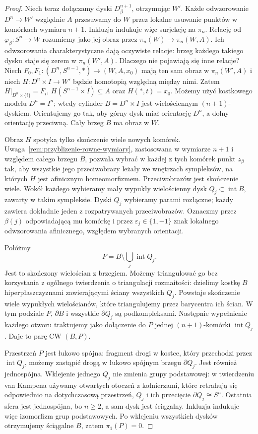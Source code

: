 \begin{proof}
Niech teraz dołączamy dyski $D^{n+1}_\beta$, otrzymując $W'$.
Każde odwzorowanie $D^n\to W'$ względnie $A$ przesuwamy do $W$
przez lokalne usuwanie punktów w komórkach wymiaru $n+1$.
Inkluzja indukuje więc surjekcję na $\pi_n$.
Relację od $\varphi_\beta:S^n\to W$ rozumiemy jako jej obraz
przez $\pi_n(W)\to\pi_n(W,A)$.
Ich odwzorowania charakterystyczne
dają oczywiste relacje:
brzeg każdego takiego
dysku staje się zerem
w $\pi_n(W',A)$.
Dlaczego nie pojawiają się inne relacje?
Niech $F_0,F_1:(D^n,S^{n-1},*)\to(W,A,x_0)$ mają
ten sam obraz w $\pi_n(W',A)$ i niech
$H:D^n\times I\to W'$ będzie homotopią względną między nimi.
Zatem $H|_{D^n\times\{i\}}=F_i$,
$H(S^{n-1}\times I)\subseteq A$ oraz $H(*,t)=x_0$.
Możemy użyć kostkowego modelu $D^n=I^n$;
wtedy cylinder $B=D^n\times I$ jest wielościennym
$(n+1)$-dyskiem. Orientujemy go tak, aby górny dysk
miał orientację $D^n$, a dolny orientację przeciwną.
Cały brzeg $B$ ma obraz w $W$.

Obraz $H$ spotyka tylko skończenie wiele nowych komórek.
Uwaga~\ref{rem:przyblizenie-rowne-wymiary}, zastosowana
w wymiarze $n+1$ i względem całego brzegu $B$, pozwala
wybrać w każdej z tych komórek punkt $z_\beta$ tak, aby
wszystkie jego przeciwobrazy leżały we wnętrzach sympleksów,
na których $H$ jest afinicznym homeomorfizmem.
Przeciwobrazów jest skończenie wiele.
Wokół każdego wybieramy mały wypukły wielościenny dysk
$Q_j\subset\operatorname{int}B$, zawarty w takim sympleksie.
Dyski $Q_j$ wybieramy parami rozłączne; każdy zawiera
dokładnie jeden z rozpatrywanych przeciwobrazów.
Oznaczmy przez $\beta(j)$ odpowiadającą mu komórkę
i przez $\varepsilon_j\in\{1,-1\}$ znak lokalnego
odwzorowania afinicznego, względem wybranych orientacji.

Połóżmy
\[
 P=B\setminus\bigcup_j\operatorname{int}Q_j.
\]
Jest to skończony wielościan z brzegiem. Możemy triangulować
go bez korzystania z ogólnego twierdzenia o triangulacji
rozmaitości: dzielimy kostkę $B$ hiperpłaszczyznami
zawierającymi ściany wszystkich $Q_j$. Powstaje skończenie
wiele wypukłych wielościanów, które triangulujemy przez
barycentra ich ścian. W tym podziale $P$, $\partial B$
i wszystkie $\partial Q_j$ są podkompleksami.
Następnie wypełnienie każdego otworu traktujemy jako
dołączenie do $P$ jednej $(n+1)$-komórki $\operatorname{int}Q_j$.
Daje to parę CW $(B,P)$.

Przestrzeń $P$ jest łukowo spójna: fragment drogi w kostce,
który przechodzi przez $\operatorname{int}Q_j$, możemy
zastąpić drogą w łukowo spójnym brzegu $\partial Q_j$.
Jest również jednospójna. Wklejenie jednego $Q_j$ nie zmienia
grupy podstawowej: w twierdzeniu van Kampena używamy
otwartych otoczeń z kołnierzami, które retrahują się
odpowiednio na dotychczasową przestrzeń, $Q_j$ i ich
przecięcie $\partial Q_j\cong S^n$.
Ostatnia sfera jest jednospójna, bo $n\geq2$,
a sam dysk jest ściągalny. Inkluzja indukuje więc
izomorfizm grup podstawowych. Po wklejeniu wszystkich
dysków otrzymujemy ściągalne $B$, zatem $\pi_1(P)=0$.


\end{proof}

